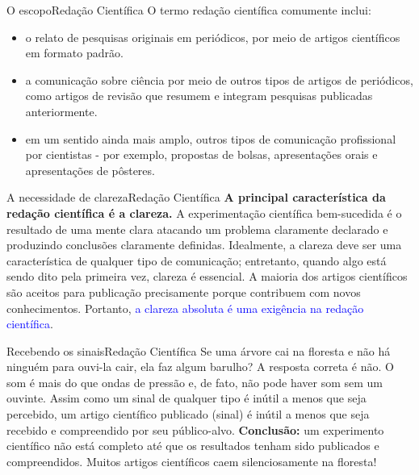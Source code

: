 \documentclass[t]{beamer}
\begin{document}


\begin{ftst}{O escopo}{Redação Científica}
\justifying
O termo redação científica comumente inclui:

\begin{itemize}
    \item o relato de pesquisas originais em periódicos, por meio de artigos científicos em formato padrão.
    \item a comunicação sobre ciência por meio de outros tipos de artigos de periódicos, como artigos de revisão que resumem e integram pesquisas publicadas anteriormente.
    \item em um sentido ainda mais amplo, outros tipos de comunicação profissional por cientistas - por exemplo, propostas de bolsas, apresentações orais e apresentações de pôsteres.
\end{itemize}


\end{ftst}


\begin{ftst}{A necessidade de clareza}{Redação Científica}
\justifying
\textbf{A principal característica da redação científica é a clareza.}
\vone
A experimentação científica bem-sucedida é o resultado de uma mente clara atacando um problema claramente declarado e produzindo conclusões claramente definidas.
\vone
Idealmente, a clareza deve ser uma característica de qualquer tipo de comunicação; entretanto, quando algo está sendo dito pela primeira vez, clareza é essencial.
\vone
A maioria dos artigos científicos são aceitos para publicação precisamente porque contribuem com novos conhecimentos. Portanto, \textcolor{blue}{a clareza absoluta é uma exigência na redação científica}.

\end{ftst}



\begin{ftst}{Recebendo os sinais}{Redação Científica}
\justifying
Se uma árvore cai na floresta e não há ninguém para ouvi-la cair, ela faz algum barulho?
\vone
A resposta correta é não. O som é mais do que ondas de pressão e, de fato, não pode haver som sem um ouvinte.
\vone
Assim como um sinal de qualquer tipo é inútil a menos que seja percebido, um artigo científico publicado (sinal) é inútil a menos que seja recebido e compreendido por seu público-alvo.
\vone
\textbf{Conclusão:} um experimento científico não está completo até que os resultados tenham sido publicados e compreendidos.
\vone
Muitos artigos científicos caem silenciosamente na floresta!

\end{ftst}
\end{document}
